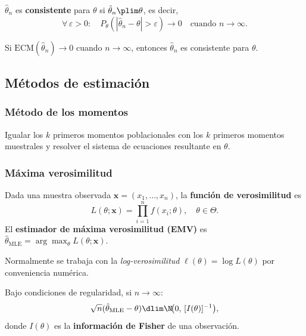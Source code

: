 \begin{defi}[Consistencia]
  $\hat{\theta}_n$ es \textbf{consistente} para $\theta$ si
  $\hat{\theta}_n \plim \theta$, es decir,
  \[
    \forall\,\varepsilon > 0: \quad
    P_\theta(|\hat{\theta}_n - \theta| > \varepsilon) \to 0
    \quad \text{cuando } n \to \infty.
  \]
\end{defi}

\begin{resultado}
  Si $\mathrm{ECM}(\hat{\theta}_n) \to 0$ cuando $n \to \infty$, entonces
  $\hat{\theta}_n$ es consistente para $\theta$.
\end{resultado}

\subsection{Métodos de estimación}

\subsubsection{Método de los momentos}

Igualar los $k$ primeros momentos poblacionales con los $k$ primeros momentos
muestrales y resolver el sistema de ecuaciones resultante en $\theta$.

\subsubsection{Máxima verosimilitud}

\begin{defi}
  Dada una muestra observada $\mathbf{x} = (x_1,\ldots,x_n)$, la
  \textbf{función de verosimilitud} es
  \[
    L(\theta; \mathbf{x}) = \prod_{i=1}^n f(x_i; \theta), \quad \theta \in \Theta.
  \]
  El \textbf{estimador de máxima verosimilitud (EMV)} es
  $\hat{\theta}_{\text{MLE}} = \arg\max_{\theta} L(\theta;\mathbf{x})$.
\end{defi}

\begin{obs}
  Normalmente se trabaja con la \emph{log-verosimilitud}
  $\ell(\theta) = \log L(\theta)$ por conveniencia numérica.
\end{obs}

\begin{teo}
  Bajo condiciones de regularidad, si $n \to \infty$:
  \[
    \sqrt{n}(\hat{\theta}_{\text{MLE}} - \theta)
    \dlim \N\!\bigl(0,\, [I(\theta)]^{-1}\bigr),
  \]
  donde $I(\theta)$ es la \textbf{información de Fisher} de una observación.
\end{teo}
